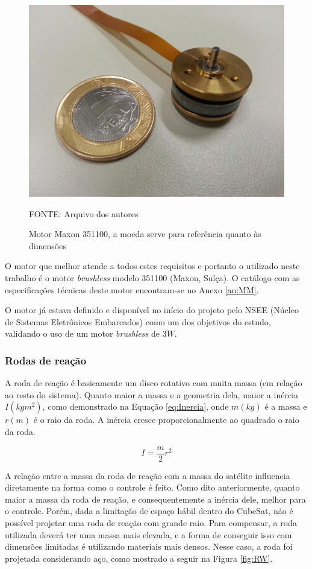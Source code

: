 \documentclass[
	12pt,				%
	openany,			%
	twoside,			%
	a4paper,			%
	english,			%
	french,				%
	spanish,			%
	brazil,				%
	oldfontcommands
	]{abntex2}
\begin{document}
\begin{figure}[th]
	\caption{Motor Maxon 351100, a moeda serve para referência quanto às dimensões}
	\centering
	\includegraphics[width=0.6\linewidth]{./figs/Maxon_351100}
	
	\begin{small}
		FONTE: Arquivo dos autores
	\end{small}
	\label{fig:Maxon}
\end{figure}

\newpage

O motor que melhor atende a todos estes requisitos e portanto o utilizado neste trabalho é o motor \textit{brushless} modelo 351100 (Maxon, Suíça). O catálogo com as especificações técnicas deste motor encontram-se no Anexo \ref{an:MM}.

O motor já estava definido e disponível no início do projeto pelo NSEE (Núcleo de Sistemas Eletrônicos Embarcados) como um dos objetivos do estudo, validando o uso de um motor \textit{brushless} de $3W$.

\subsubsection{Rodas de reação}

A roda de reação é basicamente um disco rotativo com muita massa (em relação ao resto do sistema). Quanto maior a massa e a geometria dela, maior a inércia $I(kgm^2)$, como demonstrado na Equação \ref{eq:Inercia}, onde $m(kg)$ é a massa e $r(m)$ é o raio da roda. A inércia cresce proporcionalmente ao quadrado o raio da roda.

\begin{equation}
I = \frac{m}{2} r^2
\label{eq:Inercia}
\end{equation}

A relação entre a massa da roda de reação com a massa do satélite influencia diretamente na forma como o controle é feito. Como dito anteriormente, quanto maior a massa da roda de reação, e consequentemente a inércia dele, melhor para o controle. Porém, dada a limitação de espaço hábil dentro do CubeSat, não é possível projetar uma roda de reação com grande raio. Para compensar, a roda utilizada deverá ter uma massa mais elevada, e a forma de conseguir isso com dimensões limitadas é utilizando materiais mais densos. Nesse caso, a roda foi projetada considerando aço, como mostrado a seguir na Figura \ref{fig:RW}.
\end{document}

